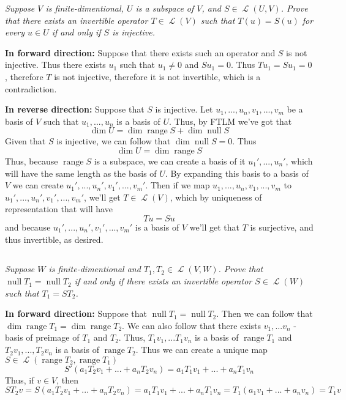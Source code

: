 \documentclass[11pt,oneside,titlepage]{book}
\DeclareMathOperator \map {\mathcal {L}}
\DeclareMathOperator \ns {null}
\DeclareMathOperator \range {range}
\begin{document}
\textit{Suppose $V$ is finite-dimentional, $U$ is a subspace of $V$, and $S \in \map (U, V)$.
  Prove that there exists an invertible operator $T \in \map(V)$ such that $T(u) = S(u)$ for
  every $u \in U$ if and only if $S$ is injective.}

\textbf{In forward direction: }
Suppose that there exists such an operator and $S$ is not injective. Thus there exists
$u_1$ such that $u_1 \neq 0$ and $S u_1 = 0$. Thus $T u_1 = S u_1 = 0$, therefore
$T$ is not injective, therefore it is not invertible, which is a contradiction.

\textbf{In reverse direction: }
Suppose that $S$ is injective. Let $u_1, ..., u_n, v_1, ..., v_m$ be a basis of $V$ such
that $u_1, ..., u_n$ is a basis of $U$. Thus, by FTLM we've got that 
$$\dim U  = \dim \range S + \dim \ns S$$
Given that $S$ is injective, we can follow that $\dim \ns S = 0$. Thus
$$\dim U  = \dim \range S$$
Thus, because $\range S$ is a subspace,  we can create a basis of it
$u_1', ..., u_n'$, which will have the same length as the basis of $U$. By expanding this basis
to a basis of $V$ we can create $u_1', ..., u_n', v_1', ..., v_m'$.
Then if we map $u_1, ..., u_n, v_1, ..., v_m$ to $u_1', ..., u_n', v_1', ..., v_m'$, we'll
get $T \in \map(V)$, which  by uniqueness of representation that will have
$$Tu = Su$$
and because $u_1', ..., u_n', v_1', ..., v_m'$ is a basis of $V$ we'll get that $T$ is
surjective, and thus invertible, as desired.

\subsection{}

\textit{Suppose $W$ is finite-dimentional and $T_1, T_2 \in \map(V, W)$. Prove that
  $\ns T_1 = \ns T_2$ if and only if there exists an invertible operator $S \in \map(W)$ such that
  $T_1 = S T_2$.}

\textbf{In forward direction: }
Suppose that $\ns T_1 = \ns T_2$. Then we can follow that $\dim \range T_1 = \dim \range T_2$.
We can also follow that there exists $v_1, ... v_n$ - basis of preimage of $T_1$ and $T_2$.
Thus, $T_1 v_1, ... T_1 v_n$ is a basis of $\range T_1$ and $T_2 v_1, ..., T_2 v_n$ is a
basis of $\range T_2$. Thus we can create a unique map $S \in \map(\range T_2, \range T_1)$
$$S'(a_1 T_2 v_1 +  ... +  a_n T_2 v_n) = a_1 T_1 v_1 +  ... +  a_n T_1 v_n$$
Thus, if $v \in V$, then
$$S T_2 v = S (a_1 T_2 v_1 + ... + a_n T_2 v_n) = a_1 T_1 v_1 + ... + a_n T_1 v_n =
T_1(a_1 v_1 + ... + a_n v_n) = T_1 v$$
\end{document}

